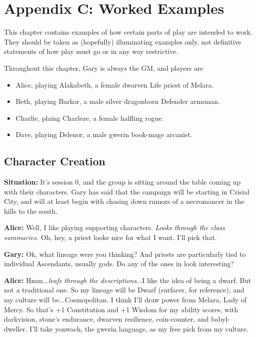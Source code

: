 \chapter{Appendix C: Worked Examples}\label{ch:examples}
This chapter contains examples of how certain parts of play are intended to work. They should be taken as (hopefully) illuminating examples only, not definitive statements of how play must go or in any way restrictive.

Throughout this chapter, Gary is always the GM, and players are
\begin{itemize}
	\item Alice, playing Alakabeth, a female dwarven Life priest of Melara.
	\item Beth, playing Barkor, a male silver dragonborn Defender armsman.
	\item Charlie, plaing Charleze, a female halfling rogue.
	\item Dave, playing Delenor, a male gwerin book-mage arcanist.
\end{itemize}

\section{Character Creation}\label{example:character-creation}
\textbf{Situation:} It's session 0, and the group is sitting around the table coming up with their characters. Gary has said that the campaign will be starting in Crisial City, and will at least begin with chasing down rumors of a necromancer in the hills to the south.

\textbf{Alice:} Well, I like playing supporting characters. \textit{Looks through the class summaries.} Oh, hey, a priest looks nice for what I want. I'll pick that.

\textbf{Gary:} Ok, what lineage were you thinking? And priests are particularly tied to individual Ascendants, usually gods. Do any of the ones in  look interesting?

\textbf{Alice:} Hmm...\textit{leafs through the descriptions}...I like the idea of being a dwarf. But not a traditional one. So my lineage will be Dwarf (surfacer, for reference), and my culture will be...Cosmopolitan. I think I'll draw power from Melara, Lady of Mercy. So that's +1 Constitution and +1 Wisdom for my ability scores, with darkvision, stone's endurance, dwarven resilience, coin-counter, and babyl-dweller. I'll take yonwach, the gwerin language, as my free pick from my culture.

